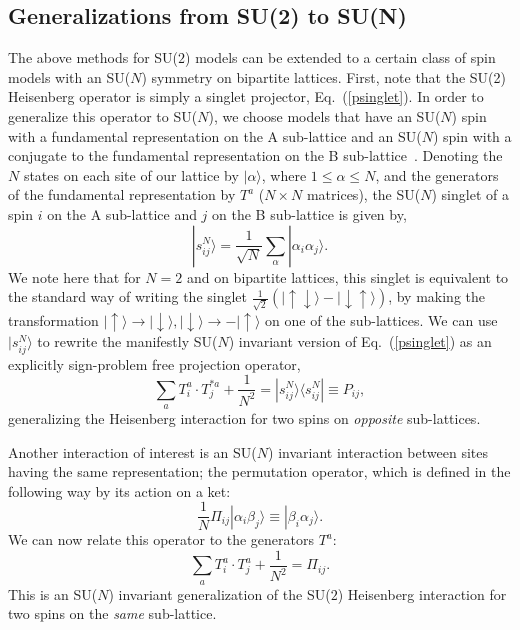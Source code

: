 \documentclass[range]{ar2e}
\begin{document}
\subsection {Generalizations from SU(2) to SU(N)}
\label{ss:su2N}

The above methods for SU($2$) models can be extended to a certain class of spin models with an SU($N$) symmetry on bipartite lattices. First, note 
that the SU(2) Heisenberg operator is simply a singlet projector, Eq.~(\ref{psinglet}). In order to generalize this operator to SU($N$), we choose models 
that have an SU($N$) spin with a fundamental representation on the A sub-lattice and an SU($N$) spin with a conjugate to the fundamental representation 
on the B sub-lattice~\cite{affleck1985:lgN,Read89}. Denoting the $N$ states on each site of our lattice 
by $|\alpha\rangle$, where $1\leq \alpha \leq N$, and the generators of the fundamental representation by $T^a$ ($N\times N$ matrices),
the SU($N$) singlet of a spin $i$ on the A sub-lattice and $j$ on the B sub-lattice is given by, 
\begin{equation}
|s^N_{ij}\rangle = \frac{1}{\sqrt{N}}\sum_\alpha |\alpha_i\alpha_j\rangle. 
\end{equation}
We note here that for $N=2$ and on bipartite lattices, this singlet is equivalent to the standard way of writing the singlet $\frac{1}{\sqrt{2}}\left (|\uparrow \downarrow\rangle -|\downarrow \uparrow\rangle \right )$, by making the transformation $|\uparrow \rangle\rightarrow |\downarrow\rangle, |\downarrow \rangle\rightarrow -|\uparrow\rangle$ on one of the sub-lattices. We can use  $|s^N_{ij}\rangle$ to rewrite the manifestly SU($N$) invariant version of Eq.~(\ref{psinglet}) as an explicitly sign-problem 
free projection operator,
\begin{equation}
\sum_a T^a_i \cdot
T^{*a}_j + \frac{1}{N^2} = |s^N_{ij}\rangle \langle s^N_{ij}|\equiv P_{ij},
\end{equation}
generalizing the Heisenberg interaction for two spins on {\em opposite} sub-lattices. 

Another interaction of interest is an SU($N$) invariant interaction between sites having the same representation; the permutation operator, 
which is defined in the following way by its action on a ket:
\begin{equation}
\frac{1}{N}\Pi_{ij}|\alpha_i\beta_j\rangle \equiv |\beta_i\alpha_j\rangle. 
\label{pija}
\end{equation}
We can now relate this operator to the generators $T^a$:
\begin{equation}
\sum_a T^a_i \cdot
T^{a}_j +\frac{1}{N^2} =\Pi_{ij}.
\label{pijb}
\end{equation}
This is an SU($N$) invariant generalization of the SU($2$) Heisenberg interaction for two spins on the {\em same} sub-lattice.
\end{document}
